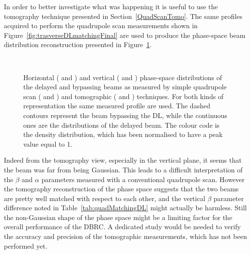 In order to better investigate what was happening it is useful to use the tomography technique
presented in Section~\ref{QuadScanTomo}.
The same profiles acquired to perform the quadrupole scan measurements shown in
Figure~\ref{fig:trasverseDLmatchingFinal} are used to produce 
the phase-space beam distribution reconstruction presented in Figure~\ref{fig:trasverseDLtomography}.
%
\begin{figure}[htbp]
\centering
{}
\qquad
{}
\\
\qquad
{}
\caption{Horizontal (\protect{} and
         \protect{}) and vertical
         (\protect{} and
         \protect{}) 
         phase-space distributions of the delayed and bypassing beams as measured by simple quadrupole
         scan (\protect{} and
         \protect{}) and tomographic
         (\protect{} and
         \protect{}) techniques.
         For both kinds of representation the same measured profile are used.
         The dashed contours represent the beam bypassing the DL, while the continuous ones are the
         distributions of the delayed beam.
         The colour code is the density distribution, which has been normalised to have a peak value
         equal to 1.
}
\label{fig:trasverseDLtomography}
\end{figure}
%
Indeed from the tomography view, especially in the vertical plane, it seems that the beam was far from
being Gaussian.
This leads to a difficult interpretation of the $\beta$ and $\alpha$ parameters measured with a
conventional quadrupole scan.
However the tomography reconstruction of the phase space suggests that the two beams are pretty well
matched with respect to each other, and the vertical $\beta$ parameter difference noted in
Table~\ref{tab:quadMatchingDL} might actually be harmless.
Still the non-Gaussian shape of the phase space might be a limiting factor for the overall performance
of the DBRC. 
A dedicated study would be needed to verify the accuracy and precision of the tomographic
measurements, which has not been performed yet.


